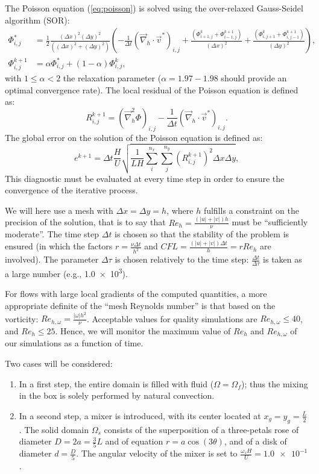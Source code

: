 \documentclass[a4paper,10pt]{scrartcl}
\newcommand\lapl{\vec{\nabla}^2}
\begin{document}
The Poisson equation (\ref{eq:poisson}) is solved using the over-relaxed Gauss-Seidel algorithm (SOR):
\begin{align} 
    \Phi_{i,j}^* &= \frac{1}{2}\frac{(\Delta x)^2(\Delta y)^2}{\left((\Delta x)^2 + (\Delta y)^2\right)}\left(-\frac{1}{\Delta t}(\vec{\nabla}_h\cdot\vec{v}^*)_{i,j} + \frac{(\Phi^k_{i+1,j} + \Phi^{k+1}_{i-1,j})}{(\Delta x)^2} + \frac{(\Phi^k_{i,j+1} + \Phi^{k+1}_{i,j-1})}{(\Delta y)^2}\right), \\
    \Phi^{k+1}_{i,j} &= \alpha\Phi^*_{i,j} + (1-\alpha)\Phi^k_{i,j},
\end{align}
with $1 \leq \alpha < 2$ the relaxation parameter ($\alpha = 1.97 - 1.98$ should provide an optimal convergence rate). The local residual of the Poisson equation is defined as:
\begin{equation} R^{k+1}_{i,j} = (\lapl_h\Phi)_{i,j} - \frac{1}{\Delta t}(\vec{\nabla}_h\cdot\vec{v}^*)_{i,j}. \end{equation}
The global error on the solution of the Poisson equation is defined as:
\begin{equation} e^{k+1} = \Delta t\frac{H}{U}\sqrt{\frac{1}{LH}\sum_i^{n_x}\sum_j^{n_y}(R_{i,j}^{k+1})^2\Delta x \Delta y}, \end{equation}
This diagnostic must be evaluated at every time step in order to ensure the convergence of the iterative process.

We will here use a mesh with $\Delta x = \Delta y = h$, where $h$ fulfills a constraint on the precision of the solution, that is to say that $Re_h = \frac{(|u|+|v|)h}{\nu}$ must be ``sufficiently moderate''. The time step $\Delta t$ is chosen so that the stability of the problem is ensured (in which the factors $r = \frac{\nu\Delta t}{h^2}$ and $CFL = \frac{(|u|+|v|)\Delta t}{h} = rRe_h$ are involved). The parameter $\Delta\tau$ is chosen relatively to the time step: $\frac{\Delta t}{\Delta\tau}$ is taken as a large number (e.g., \num{1.0e3}).

For flows with large local gradients of the computed quantities, a more appropriate definite of the ``mesh Reynolds number'' is that based on the vorticity: $Re_{h,\omega} = \frac{|\omega|h^2}{\nu}$. Acceptable values for quality simulations are $Re_{h,\omega} \leq 40$, and $Re_h \leq 25$. Hence, we will monitor the maximum value of $Re_h$ and $Re_{h,\omega}$ of our simulations as a function of time.

Two cases will be considered:
\begin{enumerate}
    \item In a first step, the entire domain is filled with fluid ($\Omega = \Omega_f$); thus the mixing in the box is solely performed by natural convection.
    \item In a second step, a mixer is introduced, with its center located at $x_g = y_g = \frac{L}{2}$. The solid domain $\Omega_s$ consists of the superposition of a three-petals rose of diameter $D = 2a = \frac{3}{5}L$ and of equation $r=a\cos(3\theta)$, and of a disk of diameter $d=\frac{D}{5}$. The angular velocity of the mixer is set to $\frac{\omega_sH}{U} = \num{1.0e-1}$.
\end{enumerate}
\end{document}

